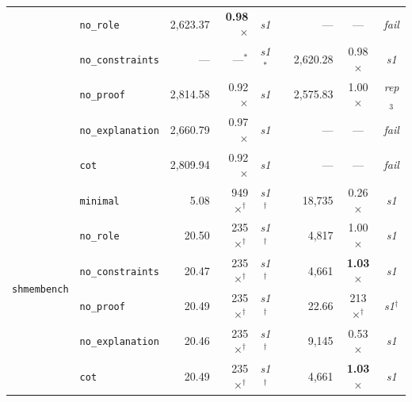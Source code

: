 \begin{table}[t]
{\begin{tabular}{@{}llrrcrrcc@{}}
  & \texttt{no\_role}        & 2{,}623.37 & \textbf{0.98}$\times$ & \textit{s1}      &&          --- & ---          & \textit{fail}    \\
  & \texttt{no\_constraints} &        --- & ---$^*$               & \textit{s1}$^*$  && 2{,}620.28   & 0.98$\times$ & \textit{s1}      \\
  & \texttt{no\_proof}       & 2{,}814.58 & 0.92$\times$          & \textit{s1}      && 2{,}575.83   & 1.00$\times$ & \textit{rep}$_3$ \\
  & \texttt{no\_explanation} & 2{,}660.79 & 0.97$\times$          & \textit{s1}      &&          --- & ---          & \textit{fail}    \\
  & \texttt{cot}             & 2{,}809.94 & 0.92$\times$          & \textit{s1}      &&          --- & ---          & \textit{fail}    \\
\midrule
\multirow{6}{*}{\texttt{shmembench}}
  & \texttt{minimal}         &     5.08 & 949$\times^\dagger$          & \textit{s1}$^\dagger$ && 18{,}735 & 0.26$\times$          & \textit{s1}           \\
  & \texttt{no\_role}        &    20.50 & 235$\times^\dagger$          & \textit{s1}$^\dagger$ &&  4{,}817 & 1.00$\times$          & \textit{s1}           \\
  & \texttt{no\_constraints} &    20.47 & 235$\times^\dagger$          & \textit{s1}$^\dagger$ &&  4{,}661 & \textbf{1.03}$\times$ & \textit{s1}           \\
  & \texttt{no\_proof}       &    20.49 & 235$\times^\dagger$          & \textit{s1}$^\dagger$ &&    22.66 & 213$\times^\dagger$   & \textit{s1}$^\dagger$ \\
  & \texttt{no\_explanation} &    20.46 & 235$\times^\dagger$          & \textit{s1}$^\dagger$ &&  9{,}145 & 0.53$\times$          & \textit{s1}           \\
  & \texttt{cot}             &    20.49 & 235$\times^\dagger$          & \textit{s1}$^\dagger$ &&  4{,}661 & \textbf{1.03}$\times$ & \textit{s1}           \\
\bottomrule
\end{tabular}%
}
\end{table}

